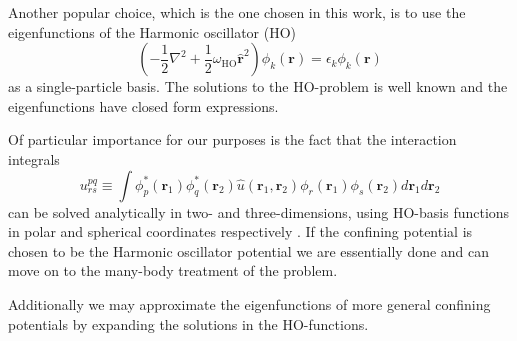 \documentclass[a4paper,10pt, twocolumn]{article}
\begin{document}
Another popular choice, which is the one chosen in this work, is to use the eigenfunctions of the Harmonic oscillator (HO) 
\begin{equation}
 \left(-\frac{1}{2}\nabla^2 + \frac{1}{2} \omega_{\text{HO}}\hat{\mathbf{r}}^2 \right) \phi_k(\mathbf{r}) = \epsilon_k \phi_k(\mathbf{r})  
\end{equation}
as a single-particle basis. The solutions to the HO-problem is well known and the eigenfunctions have closed form expressions. 

Of particular importance for our purposes is the fact that the interaction integrals
\begin{equation}
 u^{pq}_{rs} \equiv \int \phi^*_p(\mathbf{r}_1) \phi^*_q(\mathbf{r}_2) \hat{u}(\mathbf{r}_1,\mathbf{r}_2) \phi_r(\mathbf{r}_1)\phi_s(\mathbf{r}_2) d\mathbf{r}_1 d\mathbf{r}_2
\end{equation}
can be solved analytically in two- and three-dimensions, using HO-basis functions in polar and spherical coordinates respectively \cite{Anisimovas98, Vorrath2003}. If the confining potential 
is chosen to be the Harmonic oscillator potential we are essentially done and can move on to the many-body treatment of the problem.

Additionally we may approximate the eigenfunctions of more general confining potentials by expanding the solutions in the HO-functions. 
\end{document}
